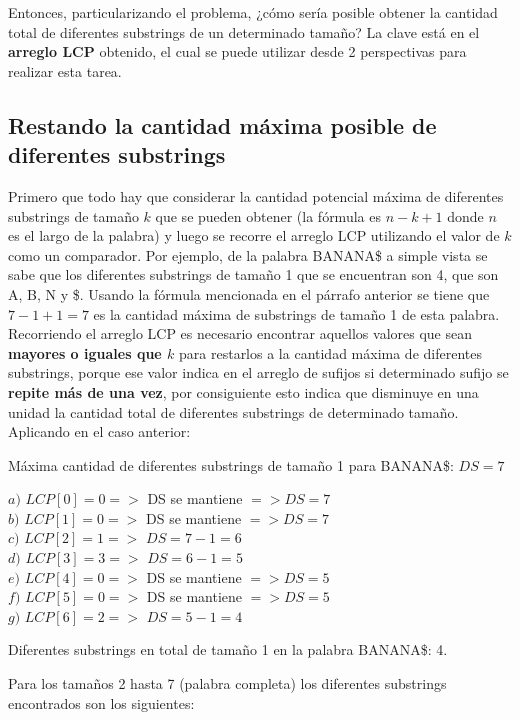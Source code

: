 Entonces, particularizando el problema, ¿cómo sería posible obtener la cantidad total de diferentes substrings de un determinado tamaño? La clave está en el \textbf{arreglo LCP} obtenido, el cual se puede utilizar desde 2 perspectivas para realizar esta tarea.

\subsection{Restando la cantidad máxima posible de diferentes substrings}

Primero que todo hay que considerar la cantidad potencial máxima de diferentes substrings de tamaño $k$ que se pueden obtener (la fórmula es $n-k+1$ donde $n$ es el largo de la palabra) y luego se recorre el arreglo LCP utilizando el valor de $k$ como un comparador.
Por ejemplo, de la palabra BANANA\$ a simple vista se sabe que los diferentes substrings de tamaño 1 que se encuentran son 4, que son A, B, N y \$. Usando la fórmula mencionada en el párrafo anterior se tiene que $7-1+1=7$ es la cantidad máxima de substrings de tamaño 1 de esta palabra. Recorriendo el arreglo LCP es necesario encontrar aquellos valores que sean \textbf{mayores o iguales que $k$} para restarlos a la cantidad máxima de diferentes substrings, porque ese valor indica en el arreglo de sufijos si determinado sufijo se \textbf{repite más de una vez}, por consiguiente esto indica que disminuye en una unidad la cantidad total de diferentes substrings de determinado tamaño. Aplicando en el caso anterior:

Máxima cantidad de diferentes substrings de tamaño 1 para BANANA\$: $DS = 7$

$a)$ $LCP[0]=0 =>$ DS se mantiene $=> DS=7$\\
$b)$ $LCP[1]=0 =>$ DS se mantiene $=> DS=7$\\ 
$c)$ $LCP[2]=1 =>$ $DS=7-1=6$\\ 
$d)$ $LCP[3]=3 =>$ $DS=6-1=5$\\
$e)$ $LCP[4]=0 =>$ DS se mantiene $=> DS=5$\\
$f)$ $LCP[5]=0 =>$ DS se mantiene $=> DS=5$\\
$g)$ $LCP[6]=2 =>$ $DS=5-1=4$ 

Diferentes substrings en total de tamaño 1 en la palabra BANANA\$: 4.

Para los tamaños 2 hasta 7 (palabra completa) los diferentes substrings encontrados son los siguientes:\\

